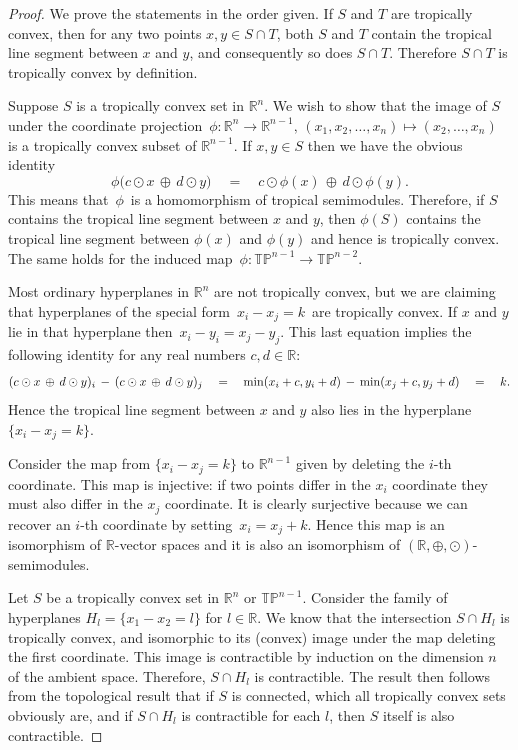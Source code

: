 \documentclass[11pt]{amsart}
\newcommand{\RR}{\mathbb{R}}
\newcommand{\TP}{\mathbb{TP}}
\begin{document}
\begin{proof}
We prove the statements in the order given. If $S$ 
and $T$ are tropically convex, then for any two points $x,y\in S\cap T$, both
$S$ and $T$ contain the tropical
line segment between $x$ and $y$, and consequently so does $S\cap T$. Therefore $S\cap T$ is
tropically convex by definition.

Suppose $S$ is a tropically convex set   in $\RR^n$.
 We wish to show that the image of $S$ under the  coordinate projection
$\,\phi : \RR^n \rightarrow \RR^{n-1}, \,
(x_1,x_2,\ldots,x_n) \mapsto (x_2,\ldots,x_n)\,$ is a tropically convex
subset of $\RR^{n-1}$. If $x,y \in S$ then we have the obvious identity
$$ \phi \bigl(c \odot x \,\oplus \,d \odot y \bigr)
\quad = \quad c \odot \phi(x) \, \oplus \,d \odot \phi(y). $$
This means that $\,\phi\,$
is a homomorphism of tropical semimodules.
 Therefore, if $S$ contains the tropical line segment between $x$ and
$y$, then $\phi(S)$ contains the tropical
line segment between $\phi(x)$ and $\phi(y)$ and hence is
tropically convex.  The same holds for the induced map
$\,\phi : \TP^{n-1} \rightarrow \TP^{n-2}$.

Most ordinary hyperplanes in $\RR^n$ are not tropically convex, but
we are claiming that hyperplanes of the special form
$\,x_i-x_j=k \,$ are tropically convex. If $x$ and $y$ lie in that
hyperplane then $\,x_i-y_i = x_j  - y_j $. This last equation implies
the following identity for any real numbers $c,d \in \RR$:
$$
(c \odot x \,\oplus \, d \odot y)_i \,-\,
(c \odot x \,\oplus \, d \odot y)_j  \quad = \quad
{\rm min}(x_i + c, y_i + d ) \, -\,
{\rm min}(x_j + c, y_j + d ) \quad = \quad k . $$
Hence the tropical line segment between $x$ and $y$ also lies
in the hyperplane $\{x_i  - x_j = k \}$.

Consider the map from $\{x_i  - x_j = k \}$
to $\RR^{n-1}$ given by deleting the $i$-th coordinate.
This map is injective: if two points
differ in the $x_i$ coordinate they must also differ in the
$x_j$ coordinate.  It is clearly surjective because we
can recover an $i$-th coordinate by setting
$\,x_i = x_j + k$. Hence this map is an isomorphism
of $\RR$-vector spaces and it is also an isomorphism
of $(\RR, \oplus, \odot)$-semimodules.


Let $S$ be a tropically convex set in $\RR^n$ or $\TP^{n-1}$.
Consider the family of hyperplanes $H_l = \{x_1-x_2=l\}$ for $l\in \RR$.
We know that the intersection $S\cap H_l$ is tropically convex,
and isomorphic to its (convex) image under the map deleting the first
coordinate. This image is contractible by induction on the dimension $n$ of the ambient space. Therefore, $S\cap H_l$
is contractible. The result then follows from the topological result that if $S$ is connected, which all tropically
convex sets obviously are, and if $S\cap H_l$ is contractible for each $l$, then $S$ itself is also contractible.


\end{proof}
\end{document}
